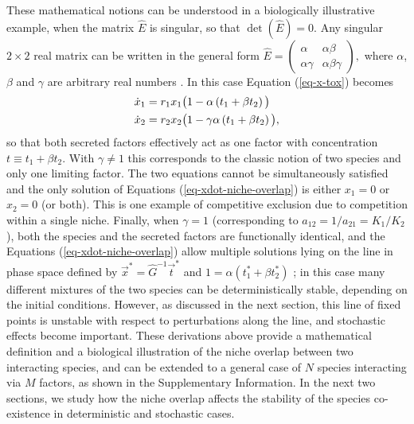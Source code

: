 These mathematical notions can be understood in a biologically illustrative example, when the matrix $\hat{E}$ is singular, so that $\det(\hat{E})=0$. Any singular $2\times 2$ real matrix can be written in the general form  $\hat{E}=\begin{pmatrix}
\alpha   & \alpha\beta \\
\alpha\gamma & \alpha\beta\gamma
\end{pmatrix},$
where $\alpha$, $\beta$ and $\gamma$ are arbitrary real numbers \cite{Larson2016}. In this case Equation (\ref{eq-x-tox}) becomes
\begin{align}
\dot{x}_1 &= r_1 x_1\big(1 -        \alpha\left( t_1 + \beta t_2 \right) \big) \notag \\
\dot{x}_2 &= r_2 x_2\big(1 - \gamma \alpha\left( t_1 + \beta t_2 \right) \big),
\label{eq-xdot-niche-overlap}
\end{align}
so that both secreted factors effectively act as one factor with concentration  $t\equiv t_1 + \beta t_2$. With $\gamma\neq 1$ this corresponds to the classic notion of two species and only one limiting factor. The two equations cannot be simultaneously satisfied and the only solution of Equations (\ref{eq-xdot-niche-overlap}) is either $x_1=0$ or $x_2=0$ (or both). This is one example of competitive exclusion due to competition within a single niche.
Finally, when $\gamma=1$ (corresponding to  $a_{12}=1/a_{21}=K_1/K_2$), both the species and the secreted factors are functionally identical, and the Equations (\ref{eq-xdot-niche-overlap}) allow multiple solutions lying on the line in phase space defined by $\vec{x}^*=\hat{G}^{-1}\vec{t}^*$  and $1=\alpha\left( t_1^* + \beta t_2^* \right)$ \cite{McGehee1977a,Constable2015}; in this case many different mixtures of the two species can be deterministically stable, depending on the initial conditions. However, as discussed in the next section, this line of fixed points is unstable with respect to perturbations along the line, and stochastic effects become important. These derivations above provide a mathematical definition and a biological illustration of the niche overlap between two interacting species, and can be extended to a general case of $N$ species interacting via $M$ factors, as shown in the Supplementary Information. In the next two sections, we study how the niche overlap affects the stability of the species co-existence in deterministic and stochastic cases.


